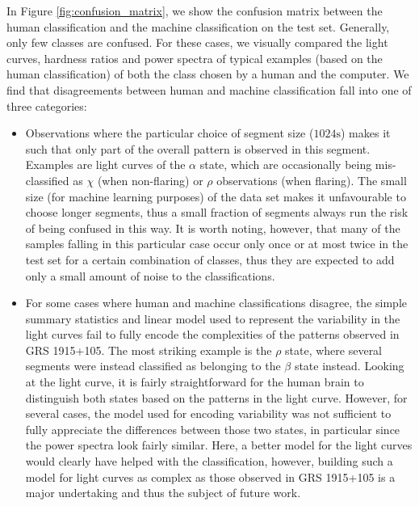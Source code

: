 \documentclass[fleqn,usenatbib]{mnras}
\begin{document}
In Figure \ref{fig:confusion_matrix}, we show the confusion matrix between the human classification and the machine classification on the 
test set. Generally, only few classes are confused. For these cases, we visually compared the light curves, hardness ratios and power spectra of 
typical examples (based on the human classification) of both the class chosen by a human and the computer. We find that disagreements between 
human and machine classification fall into one of three categories:
\begin{itemize}
\item{Observations where the particular choice of segment size ($1024\mathrm{s}$) makes it such that only part of the overall pattern is observed in this 
segment. Examples are light curves of the $\alpha$ state, which are occasionally being mis-classified as $\chi$ (when non-flaring) or $\rho$ observations (when flaring). 
The small size (for machine learning purposes) of the data set makes it unfavourable to choose longer segments, thus a small fraction of segments always run the risk of being 
confused in this way. It is worth noting, however, that many of the samples falling in this particular case occur only once or at most twice in the 
test set for a certain combination of classes, thus they are expected to add only a small amount of noise to the classifications.}
\item{For some cases where human and machine classifications disagree, the simple summary statistics and linear model used to represent the variability
 in the light curves fail to fully encode the complexities of the patterns observed in GRS 1915+105. The most striking example is the $\rho$ state, where several 
 segments were instead classified as belonging to the $\beta$ state instead. Looking at the light curve, it is fairly straightforward for the human brain to distinguish 
 both states based on the patterns in the light curve. However, for several cases, the model used for encoding variability was not sufficient to fully appreciate the differences between those two states, in particular since the power spectra look fairly similar. Here, a better model for the light curves would clearly have helped with the classification, however, building such a model for light curves as complex as those observed in GRS 1915+105 is a major undertaking and thus the subject of future work.}

\end{itemize}
\end{document}
